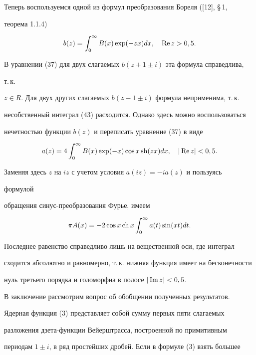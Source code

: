  


 


Теперь воспользуемся одной из формул преобразования Бореля ([12], \S\,1, 


теорема 1.1.4) 


\begin{equation} 


b(z)=\int^\infty_0 B(x)\exp(-z x)dx,\quad \re z>0,5. 


\end{equation} 


В уравнении (37) для двух слагаемых $b(z+1\pm i)$ эта формула справедлива, 


т.\,к. 


$z\in R$. Для двух других слагаемых $b(z-1\pm i)$ формула неприменима, т.\,к. 


несобственный интеграл (43) расходится. Однако здесь можно воспользоваться 


нечетностью функции $b(z)$ и переписать уравнение (37) в виде 


$$ 


a(z)=4\int^\infty_0 B(x)\exp(-x)\cos x\sh(z x)dx,\quad 


|\re z|<0,5. 


$$ 


Заменяя здесь $z$ на $iz$ с учетом условия $a(iz)=-ia(z)$ и пользуясь 


формулой 


обращения синус-преобразования Фурье, имеем 


$$ 


\pi A(x)=-2\cos x\ch x\int^\infty_0 


a(t)\sin(x t)dt. 


$$ 


Последнее равенство справедливо лишь на вещественной оси, где интеграл 


сходится абсолютно и равномерно, т.\,к. нижняя функция имеет на бесконечности 


нуль третьего порядка и голоморфна в полосе $|\operatorname{Im} z|<0,5$. 


 


В заключение рассмотрим вопрос об обобщении полученных результатов. 


Ядерная функция (3) представляет собой сумму первых пяти слагаемых 


разложения дзета-функции Вейерштрасса, построенной по примитивным 


периодам $1\pm i$, в ряд простейших дробей. Если в формуле (3) взять большее 


